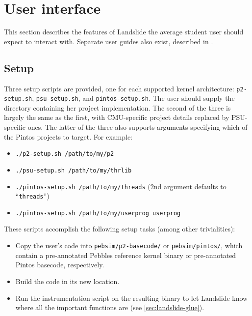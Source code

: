 \section{User interface}

This section describes the features of Landslide the average student user should expect to interact with.
Separate user guides also exist, described in .


\subsection{Setup}
\label{sec:landslide-setup}

Three setup scripts are provided, one for each supported kernel architecture: {\tt p2-setup.sh}, {\tt psu-setup.sh}, and {\tt pintos-setup.sh}.
The user should supply the directory containing her project implementation.
The second of the three is largely the same as the first, with CMU-specific project details replaced by PSU-specific ones.
The latter of the three also supports arguments specifying which of the Pintos projects to target.
For example:
\begin{itemize}
	\item {\tt ./p2-setup.sh /path/to/my/p2}
	\item {\tt ./psu-setup.sh /path/to/my/thrlib}
	\item {\tt ./pintos-setup.sh /path/to/my/threads} (2nd argument defaults to ``{\tt threads}'')
	\item {\tt ./pintos-setup.sh /path/to/my/userprog userprog}
\end{itemize}

These scripts accomplish the following setup tasks (among other trivialities):
\begin{itemize}
	\item Copy the user's code into {\tt pebsim/p2-basecode/} or {\tt pebsim/pintos/},
		which contain a pre-annotated Pebbles reference kernel binary or pre-annotated Pintos basecode, respectively.
	\item Build the code in its new location.
	\item Run the instrumentation script on the resulting binary to let Landslide know where all the important functions are
		(see \cref{sec:landslide-glue}).
\end{itemize}

